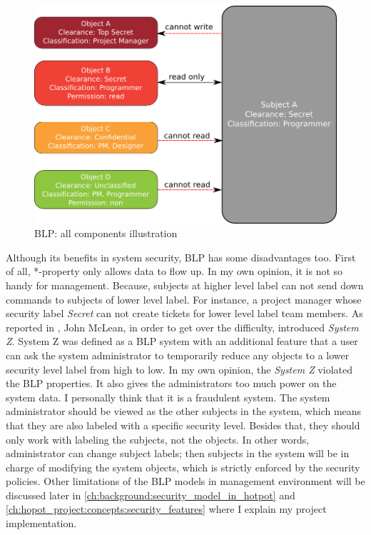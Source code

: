 \begin{figure}[bth]
\myfloatalign
\includegraphics[width=1.0\linewidth]{gfx/chapter_2/blp_example}
\caption[BLP: all components illustration]{BLP: all components illustration}
\label{fig:blp_full}
\end{figure}

Although its benefits in system security, BLP has some disadvantages too.
First of all, *-property only allows data to flow up.
In my own opinion, it is not so handy for management.
Because, subjects at higher level label can not send down commands to subjects of lower level label.
For instance, a project manager whose security label \emph{Secret} can not create tickets for lower level label team members.
As reported in \cite{ross:2008}, John McLean, in order to get over the difficulty, introduced \emph{System Z}.
System Z was defined as a BLP system with an additional feature that a user can ask the system administrator to temporarily reduce any objects to a lower security level label \ie from high to low.
In my own opinion, the \emph{System Z} violated the BLP properties.
It also gives the administrators too much power on the system data.
I personally think that it is a fraudulent system.
The system administrator should be viewed as the other subjects in the system, which means that they are also labeled with a specific security level.
Besides that, they should only work with labeling the subjects, not the objects.
In other words, administrator can change subject labels; 
then subjects in the system will be in charge of modifying the system objects, which is strictly enforced by the security policies.
Other limitations of the BLP models in management environment will be discussed later in \autoref{ch:background:security_model_in_hotpot} and \autoref{ch:hopot_project:concepts:security_features} where I explain my project implementation.

